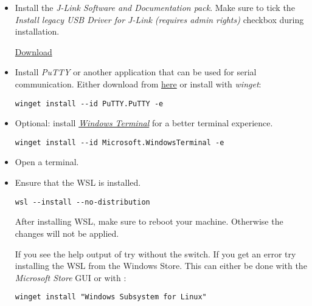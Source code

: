 \begin{itemize}
  \item Install the \emph{J-Link Software and Documentation pack}.
    Make sure to tick the \emph{Install legacy USB Driver for J-Link (requires admin rights)} checkbox during installation.

    \href{https://www.segger.com/downloads/jlink/JLink_Windows_x86_64.exe}{Download}

  \item Install \emph{PuTTY} or another application that can be used for serial
    communication.
    Either download from \href{https://putty.org/}{here} or install with \emph{winget}:

        \begin{lstlisting}
winget install --id PuTTY.PuTTY -e
\end{lstlisting}

  \item Optional: install \href{https://aka.ms/terminal}{\emph{Windows Terminal}} for a better terminal experience.

        \begin{lstlisting}
winget install --id Microsoft.WindowsTerminal -e
\end{lstlisting}

  \item Open a terminal.

  \item Ensure that the WSL is installed.
        \begin{lstlisting}
wsl --install --no-distribution
\end{lstlisting}

    \begin{infobox}
      After installing WSL, make sure to reboot your machine.
      Otherwise the changes will not be applied.
    \end{infobox}

    \begin{infobox}
      If you see the help output of  try without the  switch.
      If you get an error try installing the WSL from the Windows Store.
      This can either be done with the \emph{Microsoft Store} GUI or with :

          \begin{lstlisting}
winget install "Windows Subsystem for Linux"
\end{lstlisting}

    \end{infobox}


\end{itemize}
